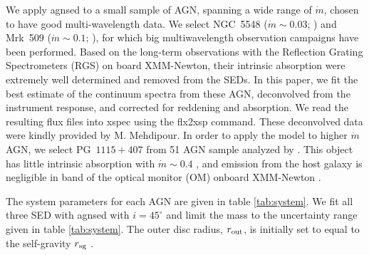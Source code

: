 \documentclass[a4paper,fleqn,usenatbib]{mnras}
\begin{document}
We apply {\sc agnsed}   to a small sample of AGN, spanning a wide range of $\dot{m}$,
 chosen to have  good multi-wavelength data.
We select NGC~5548 ($\dot{m}\sim0.03$; \citealt{5548}) and Mrk~509 ($\dot{m}\sim0.1$; \citealt{509}), for which 
big multiwavelength observation campaigns have been performed. 
Based on the long-term observations with the Reflection Grating Spectrometers (RGS) on board XMM-Newton, their intrinsic absorption were  
extremely well determined \citep{5548,detmers2011,509} and removed from the SEDs.
In this paper, we fit the best estimate of
the continuum spectra from these AGN, deconvolved from the instrument
response, and corrected for reddening and absorption. We read the
resulting flux files into {\sc xspec} using the {\sc flx2xsp} command.
These deconvolved data were kindly provided by M. Mehdipour.
%
In order to apply the model to  
higher $\dot{m}$ AGN, we select PG~$1115+407$ from 51 AGN sample analyzed by 
\cite{jin2012a}.
This object has little intrinsic absorption with $\dot{m}\sim 0.4$ \citep{jin2012a}, and emission from the host galaxy 
is negligible in band of  the optical monitor (OM) onboard XMM-Newton \citep{ezhikode2017}.




The system parameters for each AGN are given in table
\ref{tab:system}.  We fit all three SED with {\sc agnsed}   with
$i=45^\circ$ and limit the mass to the uncertainty range given in 
 table \ref{tab:system}. The outer disc
radius, $r_{\rm out}$, is initially set to equal to the self-gravity $r_{\rm sg}$ \citep{laor1989}.
\end{document}
